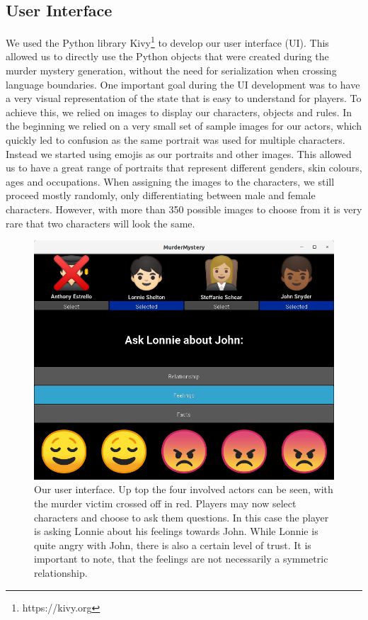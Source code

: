 \subsection{User Interface} \label{user_interface}

We used the Python library Kivy\footnote{https://kivy.org} to develop our user interface (UI).
This allowed us to directly use the Python objects that were created during the murder mystery generation, without the need for serialization when crossing language boundaries.
One important goal during the UI development was to have a very visual representation of the state that is easy to understand for players.
To achieve this, we relied on images to display our characters, objects and rules.
In the beginning we relied on a very small set of sample images for our actors, which quickly led to confusion as the same portrait was used for multiple characters.
Instead we started using emojis as our portraits and other images.
This allowed us to have a great range of portraits that represent different genders, skin colours, ages and occupations.
When assigning the images to the characters, we still proceed mostly randomly, only differentiating between male and female characters.
However, with more than 350 possible images to choose from it is very rare that two characters will look the same.

\begin{figure}
  \includegraphics[width=\columnwidth]{feelings_screensot.png}
  \caption{Our user interface. Up top the four involved actors can be seen, with the murder victim crossed off in red. Players may now select characters and choose to ask them questions. In this case the player is asking Lonnie about his feelings towards John. While Lonnie is quite angry with John, there is also a certain level of trust. It is important to note, that the feelings are not necessarily a symmetric relationship.}
  \label{fig:feelings}
\end{figure}


